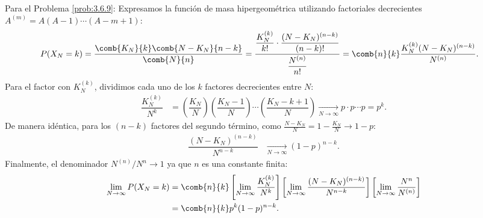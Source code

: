 \begin{solucion}
	\label{sol:3.6.9}
	Para el Problema \ref{prob:3.6.9}:
	Expresamos la función de masa hipergeométrica utilizando factoriales decrecientes $A^{(m)} = A(A-1)\cdots(A-m+1)$:
	\begin{align*}
		P(X_N = k) &= \dfrac{\comb{K_N}{k}\comb{N-K_N}{n-k}}{\comb{N}{n}} = \dfrac{\dfrac{K_N^{(k)}}{k!} \cdot \dfrac{(N-K_N)^{(n-k)}}{(n-k)!}}{\dfrac{N^{(n)}}{n!}} = \comb{n}{k} \dfrac{K_N^{(k)} (N-K_N)^{(n-k)}}{N^{(n)}}.
	\end{align*}
	Para el factor con $K_N^{(k)}$, dividimos cada uno de los $k$ factores decrecientes entre $N$:
	\begin{align*}
		\dfrac{K_N^{(k)}}{N^k} &= \left(\dfrac{K_N}{N}\right)\left(\dfrac{K_N-1}{N}\right)\cdots\left(\dfrac{K_N-k+1}{N}\right) \xrightarrow[N \to \infty]{} p \cdot p \cdots p = p^k.
	\end{align*}
	De manera idéntica, para los $(n-k)$ factores del segundo término, como $\frac{N-K_N}{N} = 1 - \frac{K_N}{N} \to 1-p$:
	\begin{align*}
		\dfrac{(N-K_N)^{(n-k)}}{N^{n-k}} &\xrightarrow[N \to \infty]{} (1-p)^{n-k}.
	\end{align*}
	Finalmente, el denominador $N^{(n)}/N^n \to 1$ ya que $n$ es una constante finita:
	\begin{align*}
		\lim_{N \to \infty} P(X_N = k) &= \comb{n}{k} \left[ \lim_{N \to \infty} \dfrac{K_N^{(k)}}{N^k} \right] \left[ \lim_{N \to \infty} \dfrac{(N-K_N)^{(n-k)}}{N^{n-k}} \right] \left[ \lim_{N \to \infty} \dfrac{N^n}{N^{(n)}} \right] \\
		&= \comb{n}{k} p^k (1-p)^{n-k}.
	\end{align*}
\end{solucion}

